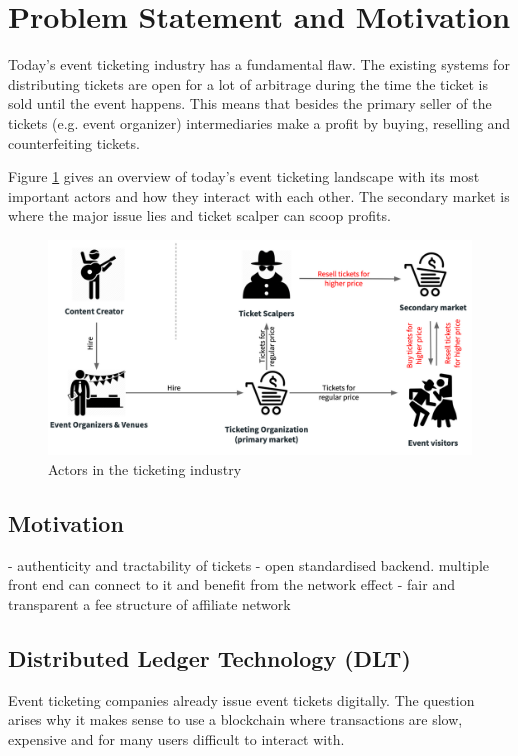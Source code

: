 
\section{Problem Statement and Motivation}
Today's event ticketing industry has a fundamental flaw. The existing systems for distributing tickets are open for a lot of arbitrage during the time the ticket is sold until the event happens. This means that besides the primary seller of the tickets (e.g. event organizer) intermediaries make a profit by buying, reselling and counterfeiting tickets. 

Figure \ref{fig:ticketing-industry-landscape} gives an overview of today's event ticketing landscape with its most important actors and how they interact with each other. The secondary market is where the major issue lies and ticket scalper can scoop profits.

\begin{figure}[H]
    \centering
    \includegraphics[width=16cm]{figures/ticketing-industry-landscape.png}
    \caption{Actors in the ticketing industry}
    \label{fig:ticketing-industry-landscape}
\end{figure}

\subsection{Motivation}
- authenticity and tractability of tickets
- open standardised backend. multiple front end can connect to it and benefit from the network effect
- fair and transparent a fee structure of affiliate network

\subsection{Distributed Ledger Technology (DLT)}
Event ticketing companies already issue event tickets digitally. The question arises why it makes sense to use a blockchain where transactions are slow, expensive and for many users difficult to interact with. 

